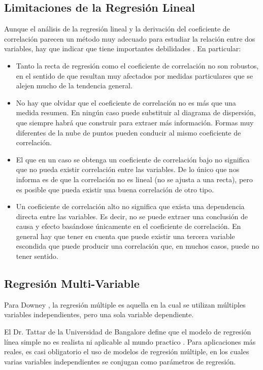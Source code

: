 \subsection{Limitaciones de la Regresión Lineal}
Aunque el análisis de la regresión lineal y la derivación del coeficiente de correlación parecen un método muy adecuado para estudiar la relación entre dos variables, hay que indicar que tiene importantes debilidades \cite{estadisticaBasica}. En particular:

\begin{itemize}
	\item Tanto la recta de regresión como el coeficiente de correlación no son robustos, en el sentido de que resultan muy afectados por medidas particulares que se alejen mucho de la tendencia general.
	\item No hay que olvidar que el coeficiente de correlación no es más que una medida resumen. En ningún caso puede substituir al diagrama de dispersión, que siempre habrá que construir para extraer más información. Formas muy diferentes de la nube de puntos pueden conducir al mismo coeficiente de correlación.
	\item El que en un caso se obtenga un coeficiente de correlación bajo no significa que no pueda existir correlación entre las variables. De lo único que nos informa es de que la correlación no es lineal (no se ajusta a una recta), pero es posible que pueda existir una buena correlación de otro tipo.
	\item Un coeficiente de correlación alto no significa que exista una dependencia directa entre las variables. Es decir, no se puede extraer una conclusión de causa y efecto basándose únicamente en el coeficiente de correlación. En general hay que tener en cuenta que puede existir una tercera variable escondida
	que puede producir una correlación que, en muchos casos, puede no tener sentido.
\end{itemize}

\subsection{Regresión Multi-Variable}
Para Downey \cite{thinkStats}, la regresión múltiple es aquella en la cual se utilizan múltiples variables independientes, pero una sola variable dependiente.

El Dr. Tattar de la Universidad de Bangalore define que el modelo de regresión línea simple no es realista ni aplicable al mundo practico \cite{narayanachar}. Para aplicaciones más reales, es casi obligatorio el uso de modelos de regresión múltiple, en los cuales varias variables independientes se conjugan como parámetros de regresión.

